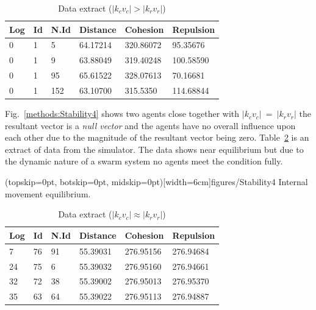 \documentclass{ieeeaccess}
\begin{document}
\begin{table}[H]
\begin{center}
\begin{tabular}{| l | l | l | l | l | l |}
\hline
Log &	Id &	N.Id &	Distance &	{\color{green}Cohesion} & {\color{red}Repulsion} 	\\ \hline
0 & 1 & 5 &	64.17214 &	{\color{green}320.86072} &	{\color{red}95.35676} \\ \hline
0 & 1 & 9 &	63.88049 &	{\color{green}319.40248} &	{\color{red}100.58590} \\ \hline
0 & 1 & 95 & 65.61522 &	{\color{green}328.07613} &	{\color{red}70.16681} \\ \hline
0 & 1 & 152 & 63.10700 & {\color{green}315.5350} & {\color{red}114.68844} \\ 
\hline
\end{tabular}\caption{Data extract ($|k_cv_c| > |k_rv_r|$)} \label{tab:SampleCohesionPositive}
\end{center}
\end{table}

Fig.~\ref{methods:Stability4} shows two agents close together with $|k_cv_c|~=~|k_rv_r|$ the resultant vector is a \emph{null vector} and the agents have no overall influence upon each other due to the magnitude of the resultant vector being zero. Table~\ref{tab:SampleEquilibrium} is an extract of data from the simulator. The data shows near equilibrium but due to the dynamic nature of a swarm system no agents meet the condition fully. 

\Figure[t!](topskip=0pt, botskip=0pt, midskip=0pt)[width=6cm]{figures/Stability4}
{Internal movement equilibrium.\label{methods:Stability4}}


\begin{table}[H]
\begin{center}
\begin{tabular}{| l | l | l | l | l | l |}
\hline
Log &	Id &	N.Id &	Distance &	{\color{green}Cohesion} &	{\color{red}Repulsion} 	\\ \hline
7 & 76 &	91 & 55.39031 & {\color{green}276.95156} & {\color{red}276.94684} \\ \hline
24 & 75 & 6 & 55.39032 & {\color{green}276.95160} & {\color{red}276.94661} \\ \hline
32 & 72 & 38 &	55.39002 & {\color{green}276.95013} & {\color{red}276.95370} \\ \hline
35 & 63 & 64 & 55.39022 &	{\color{green}276.95113} &	{\color{red}276.94887} \\
\hline
\end{tabular}\caption{Data extract ($|k_cv_c| \approx |k_rv_r|$)} \label{tab:SampleEquilibrium}
\end{center}
\end{table}
\end{document}
